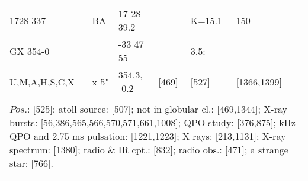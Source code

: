 \documentclass{aa}
\begin{document}
\begin{tabular}{p{2.5cm}p{1cm}p{1.8cm}p{2.3cm}p{3.3cm}p{2.0cm}p{2.2cm}}
\noalign{\smallskip}
1728-337            & BA       & 17 28 39.2          &               & K=15.1          & 150                 &           \\
 GX 354-0           &              & -33 47 55            &               & 3.5:                &                         &          \\
U,M,A,H,S,C,X  & x 5"      & 354.3, -0.2          & [469]     & [527]             & [1366,1399]   &         \\
\\
\multicolumn{7}{p{17.5cm}}{
$Pos$.: [525]; atoll source: [507]; not in globular cl.: [469,1344]; X-ray bursts: [56,386,565,566,570,571,661,1008]; 
QPO study: [376,875]; kHz QPO and 2.75 ms pulsation: [1221,1223]; 
X rays: [213,1131]; X-ray spectrum: [1380]; radio \& IR cpt.: [832]; radio obs.: [471]; a strange star: [766].}\\
\noalign{\smallskip}
\hline

\end{tabular}
\end{document}

